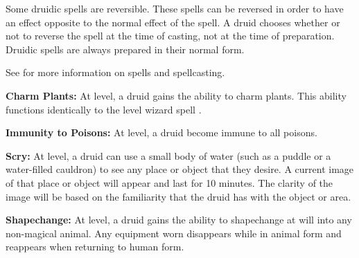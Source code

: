 \begin{multicols*}{2}
Some druidic spells are reversible. These spells can be reversed in order to have an effect opposite to the normal effect of the spell. A druid chooses whether or not to reverse the spell at the time of casting, not at the time of preparation. Druidic spells are always prepared in their normal form.

See  for more information on spells and spellcasting.

\textbf{Charm Plants:} At  level, a druid gains the ability to charm plants. This ability functions identically to the  level wizard spell .

\textbf{Immunity to Poisons:} At  level, a druid become immune to all poisons.

\textbf{Scry:} At  level, a druid can use a small body of water (such as a puddle or a water-filled cauldron) to see any place or object that they desire. A current image of that place or object will appear and last for 10 minutes. The clarity of the image will be based on the familiarity that the druid has with the object or area.

\textbf{Shapechange:} At  level, a druid gains the ability to shapechange at will into any non-magical animal. Any equipment worn disappears while in animal form and reappears when returning to human form.


\end{multicols*}
